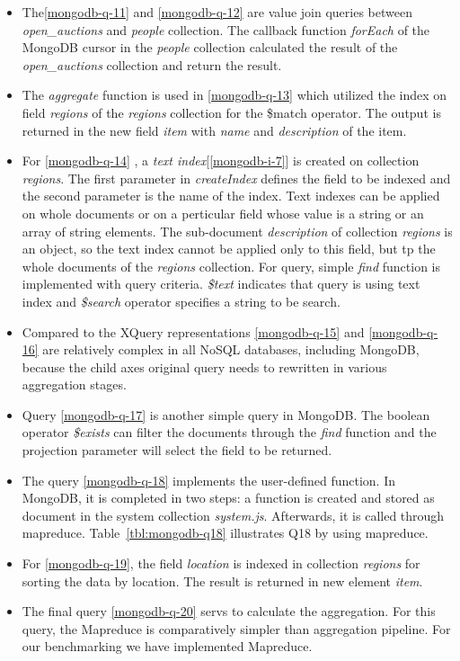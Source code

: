 \begin{itemize}
\item The\ref{mongodb-q-11} and \ref{mongodb-q-12} are value join queries between \textit{open\_auctions} and \textit{people} collection. The callback function \textit{forEach} of the MongoDB cursor in the \textit{people} collection calculated the result of the \textit{open\_auctions} collection and return the result. 

\item The \textit{aggregate} function is used in \ref{mongodb-q-13} which utilized the index on field \textit{regions} of the \textit{regions} collection for the \$match operator. The output is returned in the new field \textit{item} with \textit{name} and \textit{description} of the item.

\item For \ref{mongodb-q-14} , a \textit{text index}[\ref{mongodb-i-7}] is created on collection \textit{regions}. The first parameter in \textit{createIndex} defines the field to be indexed and the second parameter is the name of the index. Text indexes can be applied on whole documents or on a perticular field whose value is a string or an array of string elements. The sub-document \textit{description} of collection \textit{regions} is an object, so the text index cannot be applied only to this field, but tp the whole documents of the \textit{regions} collection.  For query, simple \textit{find} function is implemented with query criteria. \textit{\$text} indicates that query is using text index and \textit{\$search} operator specifies a string to be search. 

\item Compared to the XQuery representations \ref{mongodb-q-15} and \ref{mongodb-q-16} are relatively complex in all NoSQL databases, including MongoDB, because the child axes original query needs to rewritten in various aggregation stages.
\item Query \ref{mongodb-q-17} is another simple query in MongoDB. The boolean operator \textit{\$exists} can filter the documents through the \textit{find} function and the projection parameter will select the field to be returned. 

\item The query \ref{mongodb-q-18} implements the user-defined function. In MongoDB, it is completed in two steps: a function is created and stored as document in the system collection \textit{system.js}. Afterwards, it is called through mapreduce. Table~\ref{tbl:mongodb-q18} illustrates Q18 by using mapreduce.
\item For \ref{mongodb-q-19}, the field  \textit{location} is indexed in collection \textit{regions} for sorting the data by location. The result is returned in new element \textit{item}.
\item
The final query \ref{mongodb-q-20} servs to calculate the aggregation. For this query, the Mapreduce is comparatively simpler than aggregation pipeline. For our benchmarking we have implemented Mapreduce. 
\end{itemize}
